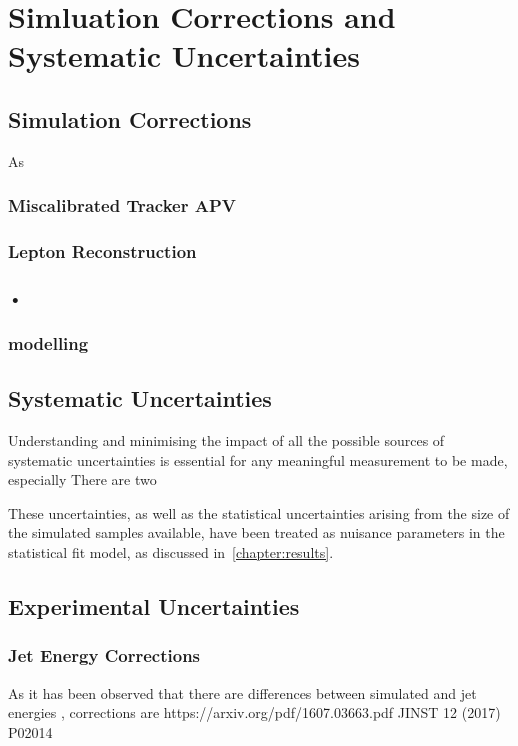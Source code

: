 \chapter{Simluation Corrections and Systematic Uncertainties}\label{chapter:tzq-systematics}

\section{Simulation Corrections}\label{sec:simCorrections}
As 

\subsection{Miscalibrated Tracker APV}
\subsection{Lepton Reconstruction}
\subsection{•}
\subsection{\PU modelling}


\section{Systematic Uncertainties}\label{sec:systematics}
Understanding and minimising the impact of all the possible sources of systematic uncertainties is essential for any
meaningful measurement to be made, especially 
There are two 

These uncertainties, as well as the statistical uncertainties arising from the size of the simulated samples available, have been treated as nuisance parameters in the statistical fit model, as discussed in~\ref{chapter:results}.

\section{Experimental Uncertainties}
\subsection{Jet Energy Corrections}
As it has been observed that there are differences between simulated and jet energies , 
corrections are
https://arxiv.org/pdf/1607.03663.pdf
JINST 12 (2017) P02014

